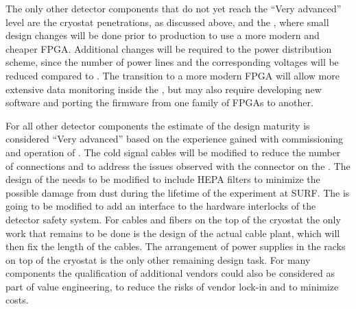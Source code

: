 The only other  detector components that do not yet
reach the ``Very advanced'' level are the cryostat penetrations, as
discussed above, and the , where small
design changes will be done prior to production to use a more
modern and cheaper FPGA. Additional changes will be required to
the power distribution scheme, since the number of power lines
and the corresponding voltages will be reduced compared to
. The transition to a more modern FPGA will allow 
more extensive data monitoring inside the , but may
also require developing new software and porting the firmware
from one family of FPGAs to another. 

For all other detector components the estimate of the design
maturity is considered ``Very advanced'' based on the experience
gained with commissioning and operation of . The 
cold signal cables will be modified to reduce the number of
connections and to address the issues observed with the connector
on the . The design of the  needs to
be modified to include HEPA filters to minimize the possible
damage from dust during the lifetime of the experiment at SURF.
The  is going to be modified to add an interface to
the hardware interlocks of the detector safety system. For
cables and fibers on the top of the cryostat the only work that
remains to be done is the design of the actual cable plant, 
which will then fix the length of the cables. The arrangement
of power supplies in the racks on top of the cryostat is the
only other remaining design task. For many components the
qualification of additional vendors could also be considered
as part of value engineering, to reduce the risks of vendor
lock-in and to minimize costs. 


